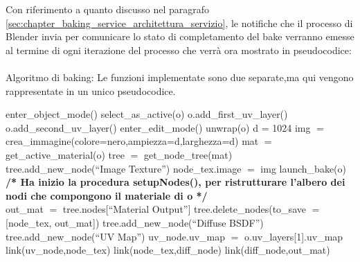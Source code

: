 Con riferimento a quanto discusso nel paragrafo \ref{sec:chapter_baking_service_architettura_servizio}, le notifiche che il processo di Blender invia per comunicare lo stato di completamento del bake verranno emesse al termine di ogni iterazione del processo che verrà ora mostrato in pseudocodice:
\\
\\
Algoritmo di baking: Le funzioni implementate sono due separate,ma qui vengono rappresentate in un unico pseudocodice.
\\
\begin{algorithm}[H]
	 {
  		 {
  			 {
      			enter\_object\_mode()\;
	  			select\_as\_active(o)\; 
	 			o.add\_first\_uv\_layer()\; 
	  			o.add\_second\_uv\_layer()\; 
				enter\_edit\_mode()\; 
				unwrap(o)\;
     		}
     		d = 1024\;
			img $=$ crea\_immagine(colore=nero,ampiezza=d,larghezza=d)\;
			mat $=$ get\_active\_material(o)\;
			tree $=$ get\_node\_tree(mat)\;
			tree.add\_new\_node(“Image Texture”)\;
			node\_tex.image $=$ img\;
			launch\_bake(o)\;
			\textbf{/* Ha inizio la procedura setupNodes(), 
			per ristrutturare l'albero dei nodi che compongono 
			il materiale di o */}
			\\
			out\_mat $=$ tree.nodes[“Material Output”]\;
			tree.delete\_nodes(to\_save $=$ [node\_tex, out\_mat])\;
			tree.add\_new\_node(“Diffuse BSDF”)\;
			tree.add\_new\_node(“UV Map”)\;
			uv\_node.uv\_map $=$ o.uv\_layers[1].uv\_map\;
			link(uv\_node,node\_tex)\;
			link(node\_tex,diff\_node)\;
			link(diff\_node,out\_mat)\;
		}
	}
\end{algorithm}

